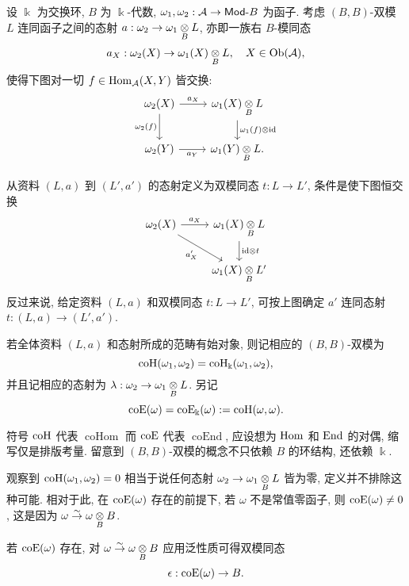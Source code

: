\begin{definition}\label{def:cogebra-L-universal}
	设 $\Bbbk$ 为交换环, $B$ 为 $\Bbbk$-代数, $\omega_1, \omega_2: \mathcal{A} \to \mathsf{Mod}\text{-}B$ 为函子. 考虑 $(B, B)$-双模 $L$ 连同函子之间的态射 $a: \omega_2 \to \omega_1 \underset{B}{\otimes} L$, 亦即一族右 $B$-模同态
	\[ a_X: \omega_2(X) \to \omega_1(X) \underset{B}{\otimes} L, \quad X \in \operatorname{Ob}(\mathcal{A}), \]
	使得下图对一切 $f \in \operatorname{Hom}_{\mathcal{A}}(X, Y)$ 皆交换:
	\[\begin{tikzcd}
		\omega_2(X) \arrow[r, "a_X"] \arrow[d, "{\omega_2(f)}"'] & \omega_1(X) \dotimes{B} L \arrow[d, "{\omega_1(f) \otimes \identity}"] \\
		\omega_2(Y) \arrow[r, "a_Y"'] & \omega_1(Y) \dotimes{B} L.
	\end{tikzcd}\]

	从资料 $(L, a)$ 到 $(L', a')$ 的态射定义为双模同态 $t: L \to L'$, 条件是使下图恒交换
	\[\begin{tikzcd}
		\omega_2(X) \arrow[r, "{a_X}"] \arrow[rd, "{a'_X}"'] & \omega_1(X) \dotimes{B} L \arrow[d, "{\identity \otimes t}"] \\
		& \omega_1(X) \dotimes{B} L'
 	\end{tikzcd}\]
 	反过来说, 给定资料 $(L, a)$ 和双模同态 $t: L \to L'$, 可按上图确定 $a'$ 连同态射 $t: (L, a) \to (L', a')$.
 
	若全体资料 $(L, a)$ 和态射所成的范畴有始对象, 则记相应的 $(B, B)$-双模为
	\[ \operatorname{coH}(\omega_1, \omega_2) = \operatorname{coH}_{\Bbbk}(\omega_1, \omega_2), \]
	并且记相应的态射为 $\lambda: \omega_2 \to \omega_1 \underset{B}{\otimes} L$. 另记
	\[ \operatorname{coE}(\omega) = \operatorname{coE}_{\Bbbk}(\omega) := \operatorname{coH}(\omega, \omega). \]
\end{definition}

符号 $\operatorname{coH}$ 代表 $\operatorname{coHom}$ 而 $\operatorname{coE}$ 代表 $\operatorname{coEnd}$, 应设想为 $\operatorname{Hom}$ 和 $\operatorname{End}$ 的对偶, 缩写仅是排版考量. 留意到 $(B, B)$-双模的概念不只依赖 $B$ 的环结构, 还依赖 $\Bbbk$.

\begin{remark}
	观察到 $\operatorname{coH}(\omega_1, \omega_2) = 0$ 相当于说任何态射 $\omega_2 \to \omega_1 \underset{B}{\otimes} L$ 皆为零, 定义并不排除这种可能. 相对于此, 在 $\operatorname{coE}(\omega)$ 存在的前提下, 若 $\omega$ 不是常值零函子, 则 $\operatorname{coE}(\omega) \neq 0$, 这是因为 $\omega \stackrel{\sim}{\rightarrow} \omega \underset{B}{\otimes} B$.
\end{remark}

若 $\operatorname{coE}(\omega)$ 存在, 对 $\omega \stackrel{\sim}{\rightarrow} \omega \underset{B}{\otimes} B$ 应用泛性质可得双模同态
\[ \epsilon: \operatorname{coE}(\omega) \to B. \]

